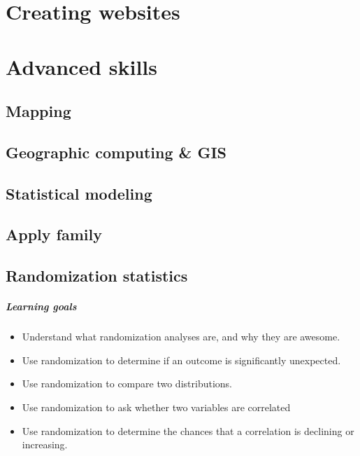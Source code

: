\documentclass[
]{book}
\providecommand{\tightlist}{%
  \setlength{\itemsep}{0pt}\setlength{\parskip}{0pt}}
\begin{document}
\hypertarget{part-creating-websites}{%
\part{Creating websites}\label{part-creating-websites}}

\hypertarget{part-advanced-skills}{%
\part{Advanced skills}\label{part-advanced-skills}}

\hypertarget{mapping}{%
\chapter{Mapping}\label{mapping}}

\hypertarget{geographic-computing-gis}{%
\chapter{Geographic computing \& GIS}\label{geographic-computing-gis}}

\hypertarget{statistical-modeling}{%
\chapter{Statistical modeling}\label{statistical-modeling}}

\hypertarget{apply-family}{%
\chapter{Apply family}\label{apply-family}}

\hypertarget{randomization-statistics}{%
\chapter{Randomization statistics}\label{randomization-statistics}}

\hypertarget{learning-goals-19}{%
\subsubsection*{Learning goals}\label{learning-goals-19}}

\begin{itemize}
\tightlist
\item
  Understand what randomization analyses are, and why they are awesome.
\item
  Use randomization to determine if an outcome is significantly unexpected.
\item
  Use randomization to compare two distributions.
\item
  Use randomization to ask whether two variables are correlated
\item
  Use randomization to determine the chances that a correlation is declining or increasing.
\end{itemize}
\end{document}
